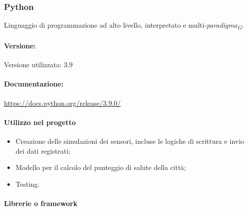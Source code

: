 \subsubsection{Python}
Linguaggio di programmazione ad alto livello, interpretato e multi-\textit{paradigma}\textsubscript{\textit{G}}.

\paragraph{Versione:}
Versione utilizzata: 3.9
\paragraph{Documentazione:}
\url{https://docs.python.org/release/3.9.0/}

\paragraph{Utilizzo nel progetto} 
\begin{itemize}
    \item Creazione delle simulazioni dei sensori, incluse le logiche di scrittura e invio dei dati registrati;
    \item Modello per il calcolo del punteggio di salute della città;
    \item Testing.
\end{itemize}

\paragraph{Librerie o framework}

